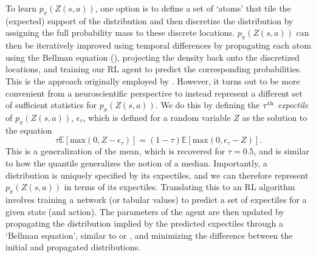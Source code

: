 To learn $p_\pi(Z(s, a))$, one option is to define a set of `atoms' that tile the (expected) support of the distribution and then discretize the distribution by assigning the full probability mass to these discrete locations.
$p_\pi(Z(s, a))$ can then be iteratively improved using temporal differences by propagating each atom using the Bellman equation (), projecting the density back onto the discretized locations, and training our RL agent to predict the corresponding probabilities.
This is the approach originally employed by \citet{bellemare2017distributional}.
However, it turns out to be more convenient from a neuroscientific perspective to instead represent a different set of sufficient statistics for $p_\pi(Z(s, a))$.
We do this by defining the $\tau\textsuperscript{th}$ \emph{expectile} of $p_\pi(Z(s, a))$, $\epsilon_\tau$, which is defined for a random variable $Z$ as the solution to the equation
\begin{equation}
    \tau \mathbb{E} [\text{max}(0, Z - \epsilon_\tau)] = (1-\tau) \mathbb{E} [\text{max}(0, \epsilon_\tau - Z)].
\end{equation}
This is a generalization of the mean, which is recovered for $\tau = 0.5$, and is similar to how the quantile generalizes the notion of a median.
Importantly, a distribution is uniquely specified by its expectiles, and we can therefore represent $p_\pi(Z(s, a))$ in terms of its expectiles.
Translating this to an RL algorithm involves training a network (or tabular values) to predict a set of expectiles for a given state (and action).
The parameters of the agent are then updated by propagating the distribution implied by the predicted expectiles through a `Bellman equation', similar to  or , and minimizing the difference between the initial and propagated distributions.


